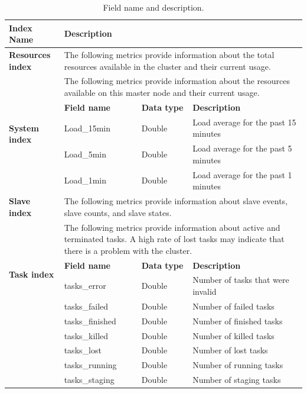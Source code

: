 \documentclass[12pt,oneside,openright,a4paper]{cpe-english-project}
\begin{document}
\begin{table}[!h]
\caption{Field name and description.}\label{tbl:fieldName}
\begin{tabular}{|p{}|p{}|p{}|p{}|}
\hline
\textbf{Index Name} & \multicolumn{3}{p{0.7\textwidth}|}{\textbf{Description}}  \\ 
\hline
\textbf{Resources index} & \multicolumn{3}{p{0.7\textwidth}|}{ The following metrics provide information about the total resources available in the cluster and their current usage.} \\ 
\hline
\multirow{5}{*}{\textbf{System index}} & \multicolumn{3}{p{0.7\textwidth}|}{ The following metrics provide information about the resources available on this master node and their current usage.} \\ 
\cline{2-4} & \textbf{Field name} & \textbf{Data type} & \textbf{Description} \\ 
\cline{2-4} & Load\_15min & Double & Load average for the past 15 minutes \\ 
\cline{2-4} & Load\_5min & Double & Load average for the past 5 minutes \\ 
\cline{2-4} & Load\_1min & Double & Load average for the past 1 minutes \\ 
\hline
\textbf{Slave index} & \multicolumn{3}{p{0.7\textwidth}|}{ The following metrics provide information about slave events, slave counts, and slave states.} \\ 
\hline
\multirow{5}{*}{\textbf{Task index}} & \multicolumn{3}{p{0.7\textwidth}|}{ The following metrics provide information about active and terminated tasks. A high rate of lost tasks may indicate that there is a problem with the cluster.} \\ 
\cline{2-4} & \textbf{Field name} & \textbf{Data type} & \textbf{Description} \\ 
\cline{2-4} & tasks\_error & Double & Number of tasks that were invalid \\ 
\cline{2-4} & tasks\_failed & Double & Number of failed tasks \\ 
\cline{2-4} & tasks\_finished & Double & Number of finished tasks \\ 
\cline{2-4} & tasks\_killed & Double & Number of killed tasks \\ 
\cline{2-4} & tasks\_lost & Double & Number of lost tasks \\ 
\cline{2-4} & tasks\_running & Double & Number of running tasks \\ 
\cline{2-4} & tasks\_staging & Double & Number of staging tasks \\ 

\end{tabular}
\end{table}
\end{document}
